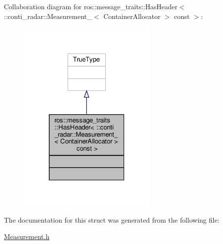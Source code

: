 Collaboration diagram for ros\+:\+:message\+\_\+traits\+:\+:Has\+Header$<$ \+:\+:conti\+\_\+radar\+:\+:Measurement\+\_\+$<$ Container\+Allocator $>$ const $>$\+:\nopagebreak
\begin{figure}[H]
\begin{center}
\leavevmode
\includegraphics[width=195pt]{d9/da6/structros_1_1message__traits_1_1HasHeader_3_01_1_1conti__radar_1_1Measurement___3_01ContainerAll07da043b8083ed2906c725483a0f3023}
\end{center}
\end{figure}


The documentation for this struct was generated from the following file\+:\begin{DoxyCompactItemize}
\item 
\hyperlink{Measurement_8h}{Measurement.\+h}\end{DoxyCompactItemize}
